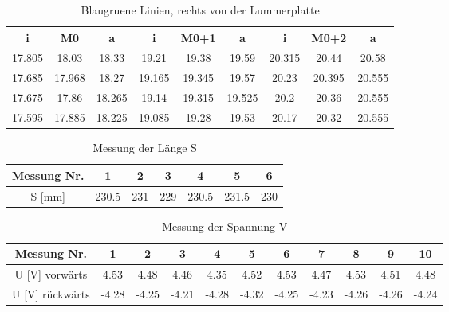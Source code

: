 \documentclass[a4paper,parskip,11pt, DIV12]{scrreprt}
\begin{document}
	
	\begin{table}[H]
	\begin{tabular}{|c|c|c||c|c|c||c|c|c|}
	\hline 
i	&	M0	&	a	&	i	&	M0+1	&	a	&	i	&	M0+2	&	a	\\
	\hline
	\hline
17.805	&	18.03	&	18.33	&	19.21	&	19.38	&	19.59	&	20.315	&	20.44	&	20.58	\\
	\hline
17.685	&	17.968	&	18.27	&	19.165	&	19.345	&	19.57	&	20.23	&	20.395	&	20.555	\\
	\hline
17.675	&	17.86	&	18.265	&	19.14	&	19.315	&	19.525	&	20.2	&	20.36	&	20.555	\\
	\hline
17.595	&	17.885	&	18.225	&	19.085	&	19.28	&	19.53	&	20.17	&	20.32	&	20.555	\\
	\hline
	\end{tabular} 
	\caption{Blaugruene Linien, rechts von der Lummerplatte}
	\end{table}
	
	\begin{table}[H]
	\begin{tabular}{|c|c|c|c|c|c|c|}
	\hline 
Messung Nr.	&	1	&	2	&	3	&	4	&	5	&	6	\\
\hline
S [mm]	&	230.5	&	231	&	229	&	230.5	&	231.5	&	230	\\
	\hline
	\end{tabular} 
	\caption{Messung der Länge S}
	\end{table}
	
	\begin{table}[H]
	\begin{tabular}{|c|c|c|c|c|c|c|c|c|c|c|}
	\hline 
Messung Nr.	&	1	&	2	&	3	&	4	&	5	&	6	&	7	&	8	&	9	&	10	\\
\hline
U [V] vorwärts	&	4.53	&	4.48	&	4.46	&	4.35	&	4.52	&	4.53	&	4.47	&	4.53	&	4.51	&	4.48	\\
\hline
U [V] rückwärts	&	-4.28	&	-4.25	&	-4.21	&	-4.28	&	-4.32	&	-4.25	&	-4.23	&	-4.26	&	-4.26	&	-4.24	\\
	\hline
	\end{tabular} 
	\caption{Messung der Spannung V}
	\end{table}
\end{document}
